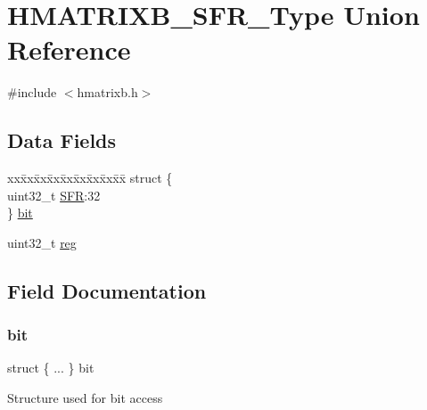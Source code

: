 \hypertarget{union_h_m_a_t_r_i_x_b___s_f_r___type}{}\section{H\+M\+A\+T\+R\+I\+X\+B\+\_\+\+S\+F\+R\+\_\+\+Type Union Reference}
\label{union_h_m_a_t_r_i_x_b___s_f_r___type}


{\ttfamily \#include $<$hmatrixb.\+h$>$}

\subsection*{Data Fields}
\begin{DoxyCompactItemize}
\item 
\begin{tabbing}
xx\=xx\=xx\=xx\=xx\=xx\=xx\=xx\=xx\=\kill
struct \{\\
\>uint32\_t \mbox{\hyperlink{union_h_m_a_t_r_i_x_b___s_f_r___type_a9fab63593f960af63f0369bdc0b94a42}{SFR}}:32\\
\} \mbox{\hyperlink{union_h_m_a_t_r_i_x_b___s_f_r___type_a9f7139b6988e88c88f769563853a2805}{bit}}\\

\end{tabbing}\item 
uint32\+\_\+t \mbox{\hyperlink{union_h_m_a_t_r_i_x_b___s_f_r___type_a6b91636401516a477989a336376d7b40}{reg}}
\end{DoxyCompactItemize}


\subsection{Field Documentation}
\mbox{\label{union_h_m_a_t_r_i_x_b___s_f_r___type_a9f7139b6988e88c88f769563853a2805}} 
\subsubsection{\texorpdfstring{bit}{bit}}
{\footnotesize\ttfamily struct \{ ... \}   bit}

Structure used for bit access \mbox{\label{union_h_m_a_t_r_i_x_b___s_f_r___type_a6b91636401516a477989a336376d7b40}} 

